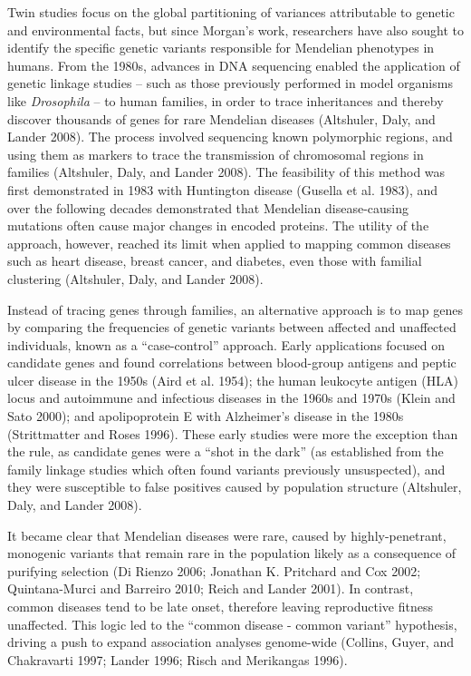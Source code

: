 \documentclass[
]{book}
\begin{document}
Twin studies focus on the global partitioning of variances attributable to genetic and environmental facts, but since Morgan's work, researchers have also sought to identify the specific genetic variants responsible for Mendelian phenotypes in humans. From the 1980s, advances in DNA sequencing enabled the application of genetic linkage studies -- such as those previously performed in model organisms like \emph{Drosophila} -- to human families, in order to trace inheritances and thereby discover thousands of genes for rare Mendelian diseases (Altshuler, Daly, and Lander 2008). The process involved sequencing known polymorphic regions, and using them as markers to trace the transmission of chromosomal regions in families (Altshuler, Daly, and Lander 2008). The feasibility of this method was first demonstrated in 1983 with Huntington disease (Gusella et al. 1983), and over the following decades demonstrated that Mendelian disease-causing mutations often cause major changes in encoded proteins. The utility of the approach, however, reached its limit when applied to mapping common diseases such as heart disease, breast cancer, and diabetes, even those with familial clustering (Altshuler, Daly, and Lander 2008).

Instead of tracing genes through families, an alternative approach is to map genes by comparing the frequencies of genetic variants between affected and unaffected individuals, known as a ``case-control'' approach. Early applications focused on candidate genes and found correlations between blood-group antigens and peptic ulcer disease in the 1950s (Aird et al. 1954); the human leukocyte antigen (HLA) locus and autoimmune and infectious diseases in the 1960s and 1970s (Klein and Sato 2000); and apolipoprotein E with Alzheimer's disease in the 1980s (Strittmatter and Roses 1996). These early studies were more the exception than the rule, as candidate genes were a ``shot in the dark'' (as established from the family linkage studies which often found variants previously unsuspected), and they were susceptible to false positives caused by population structure (Altshuler, Daly, and Lander 2008).

It became clear that Mendelian diseases were rare, caused by highly-penetrant, monogenic variants that remain rare in the population likely as a consequence of purifying selection (Di Rienzo 2006; Jonathan K. Pritchard and Cox 2002; Quintana-Murci and Barreiro 2010; Reich and Lander 2001). In contrast, common diseases tend to be late onset, therefore leaving reproductive fitness unaffected. This logic led to the ``common disease - common variant'' hypothesis, driving a push to expand association analyses genome-wide (Collins, Guyer, and Chakravarti 1997; Lander 1996; Risch and Merikangas 1996).
\end{document}
